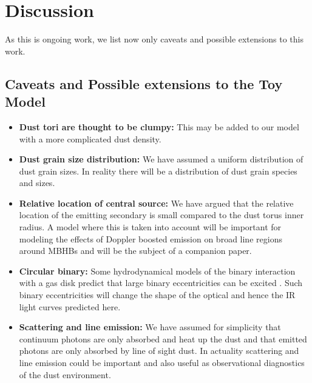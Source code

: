\section{Discussion}
\label{S:Discussion}
As this is ongoing work, we list now only caveats and possible extensions to this work.

\subsection{Caveats and Possible extensions to the Toy Model}
\begin{itemize}
\item \textbf{Dust tori are thought to be clumpy:} This may be added to our model with a more complicated dust density. %
%
\item \textbf{Dust grain size distribution:} We have assumed a uniform distribution of dust grain sizes. In reality there will be a distribution of dust grain species and sizes. %
%
\item \textbf{Relative location of central source:} We have argued that the relative location of the emitting secondary is small compared to the dust torus inner radius. A model where this is taken into account will be important for modeling the effects of Doppler boosted emission on broad line regions around MBHBs and will be the subject of a companion paper.
%
\item \textbf{Circular binary:} Some hydrodynamical models of the binary interaction with a gas disk predict that large binary eccentricities can be excited \citep{Roedig:2011:eccevo}. Such binary eccentricities will change the shape of the optical and hence the IR light curves predicted here. 
%
%
\item \textbf{Scattering and line emission:} We have assumed for simplicity that continuum photons are only absorbed and heat up the dust and that  emitted photons are only absorbed by line of sight dust. In actuality scattering and line emission could be important and also useful as observational diagnostics of the dust environment.


\end{itemize}
